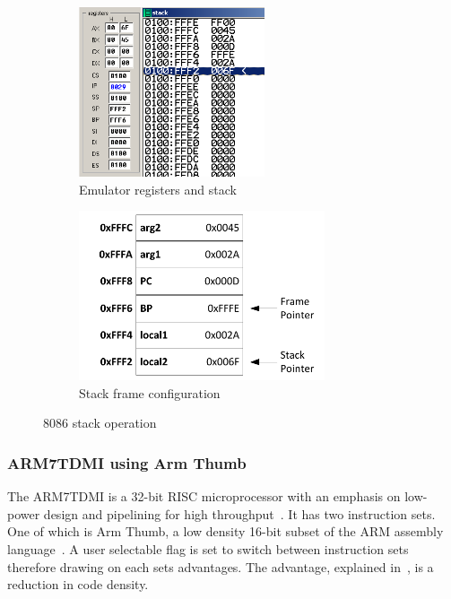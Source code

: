 \documentclass[12pt,a4paper]{article}
\begin{document}
\begin{figure}[htb]
        \centering
        \begin{subfigure}[b]{0.5\textwidth}
                \includegraphics[height=5cm]{Figures/emu.png}
                \caption{Emulator registers and stack}
                \label{fig:emu}
        \end{subfigure}%
        \begin{subfigure}[b]{0.5\textwidth}
                \includegraphics[height=5cm]{Figures/stack.pdf}
                \caption{Stack frame configuration}
                \label{fig:stack}
        \end{subfigure}
        \caption{8086 stack operation}
        \label{fig:8086}
\end{figure}







\subsubsection{ARM7TDMI using Arm Thumb}
The ARM7TDMI is a 32-bit RISC microprocessor with an emphasis on low-power design and pipelining for high throughput~\cite{ARM7TDMI}.
It has two instruction sets. One of which is Arm Thumb, a low density 16-bit subset of the ARM assembly language~\cite{arm}.
A user selectable flag is set to switch between instruction sets therefore drawing on each sets advantages.
The advantage, explained in~\cite{ARMs}, is a reduction in code density. 
\end{document}
